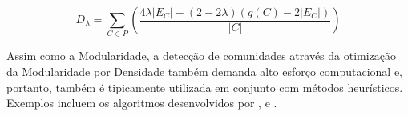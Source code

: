 \begin{equation}
    \label{eq:density2}
    D_{\lambda} = \sum_{C \in P} \left ( \frac{4\lambda|E_C| - (2 - 2\lambda) (g(C) - 2|E_C|) }{|C|} \right )
\end{equation}

Assim como a Modularidade, a detecção de comunidades através da otimização da Modularidade por Densidade também demanda alto esforço computacional e, portanto, também é tipicamente utilizada em conjunto com métodos heurísticos. Exemplos incluem os algoritmos desenvolvidos por ,  e .